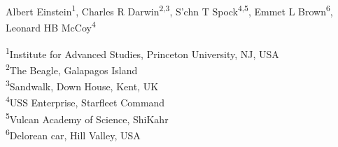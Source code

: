 {Albert  Einstein}\textsuperscript{1},
{Charles R Darwin}\textsuperscript{2,3},
{S'chn T Spock}\textsuperscript{4,5},
{Emmet L Brown}\textsuperscript{6},
{Leonard HB McCoy}\textsuperscript{4}


\textsuperscript{1}{Institute for Advanced Studies, Princeton University, NJ, USA}\\ 
\textsuperscript{2}{The Beagle, Galapagos Island}\\ 
\textsuperscript{3}{Sandwalk,  Down House, Kent, UK}\\ 
\textsuperscript{4}{USS Enterprise, Starfleet Command}\\ 
\textsuperscript{5}{Vulcan Academy of Science, ShiKahr}\\ 
\textsuperscript{6}{Delorean car, Hill Valley, USA}\\ 
